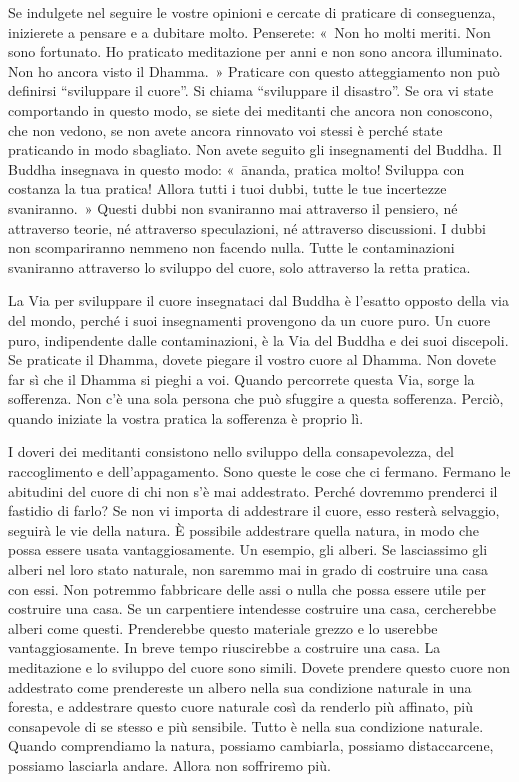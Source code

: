 Se indulgete nel seguire le vostre opinioni e cercate di praticare di
conseguenza, inizierete a pensare e a dubitare molto. Penserete: «~Non
ho molti meriti. Non sono fortunato. Ho praticato meditazione per anni e
non sono ancora illuminato. Non ho ancora visto il Dhamma.~» Praticare
con questo atteggiamento non può definirsi ``sviluppare il cuore''. Si
chiama ``sviluppare il disastro''. Se ora vi state comportando in questo
modo, se siete dei meditanti che ancora non conoscono, che non vedono,
se non avete ancora rinnovato voi stessi è perché state praticando in
modo sbagliato. Non avete seguito gli insegnamenti del Buddha. Il Buddha
insegnava in questo modo: «~ānanda, pratica molto! Sviluppa con costanza
la tua pratica! Allora tutti i tuoi dubbi, tutte le tue incertezze
svaniranno.~» Questi dubbi non svaniranno mai attraverso il pensiero, né
attraverso teorie, né attraverso speculazioni, né attraverso
discussioni. I dubbi non scompariranno nemmeno non facendo nulla. Tutte
le contaminazioni svaniranno attraverso lo sviluppo del cuore, solo
attraverso la retta pratica.

La Via per sviluppare il cuore insegnataci dal Buddha è l'esatto opposto
della via del mondo, perché i suoi insegnamenti provengono da un cuore
puro. Un cuore puro, indipendente dalle contaminazioni, è la Via del
Buddha e dei suoi discepoli. Se praticate il Dhamma, dovete piegare il
vostro cuore al Dhamma. Non dovete far sì che il Dhamma si pieghi a voi.
Quando percorrete questa Via, sorge la sofferenza. Non c'è una sola
persona che può sfuggire a questa sofferenza. Perciò, quando iniziate la
vostra pratica la sofferenza è proprio lì.

I doveri dei meditanti consistono nello sviluppo della consapevolezza,
del raccoglimento e dell'appagamento. Sono queste le cose che ci
fermano. Fermano le abitudini del cuore di chi non s'è mai addestrato.
Perché dovremmo prenderci il fastidio di farlo? Se non vi importa di
addestrare il cuore, esso resterà selvaggio, seguirà le vie della
natura. È possibile addestrare quella natura, in modo che possa essere
usata vantaggiosamente. Un esempio, gli alberi. Se lasciassimo gli
alberi nel loro stato naturale, non saremmo mai in grado di costruire
una casa con essi. Non potremmo fabbricare delle assi o nulla che possa
essere utile per costruire una casa. Se un carpentiere intendesse
costruire una casa, cercherebbe alberi come questi. Prenderebbe questo
materiale grezzo e lo userebbe vantaggiosamente. In breve tempo
riuscirebbe a costruire una casa. La meditazione e lo sviluppo del cuore
sono simili. Dovete prendere questo cuore non addestrato come
prendereste un albero nella sua condizione naturale in una foresta, e
addestrare questo cuore naturale così da renderlo più affinato, più
consapevole di se stesso e più sensibile. Tutto è nella sua condizione
naturale. Quando comprendiamo la natura, possiamo cambiarla, possiamo
distaccarcene, possiamo lasciarla andare. Allora non soffriremo più.

